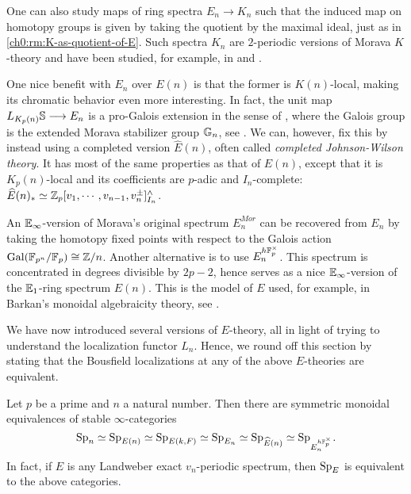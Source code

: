 \begin{remark}
    One can also study maps of ring spectra $E_n \longrightarrow K_n$ such that the induced map on homotopy groups is given by taking the quotient by the maximal ideal, just as in \cref{ch0:rm:K-as-quotient-of-E}. Such spectra $K_n$ are $2$-periodic versions of Morava $K$-theory and have been studied, for example, in \cite{hopkins-lurie_17} and \cite{barthel-pstragowski_2021}. 
\end{remark}

\begin{remark}
    One nice benefit with $E_n$ over $E(n)$ is that the former is $K(n)$-local, making its chromatic behavior even more interesting. In fact, the unit map $L_{K_p(n)}\S \longrightarrow E_n$ is a pro-Galois extension in the sense of \cite{rognes_08}, where the Galois group is the extended Morava stabilizer group $\G_n$, see \cite{devinatz-hopkins_2004}. We can, however, fix this by instead using a completed version $\widehat{E}(n)$, often called \emph{completed Johnson-Wilson theory}. It has most of the same properties as that of $E(n)$, except that it is $K_p(n)$-local and its coefficients are $p$-adic and $I_n$-complete: $\widehat{E}(n)_* \simeq \Z_p[v_1, \cdots, v_{n-1}, v_n^{\pm}]^\wedge_{I_n}$. 
\end{remark}

\begin{remark}
    An $\E_\infty$-version of Morava's original spectrum $E_n^{Mor}$ can be recovered from $E_n$ by taking the homotopy fixed points with respect to the Galois action $\mathrm{Gal}(\F_{p^n}/\F_p)\cong \Z/n$. Another alternative is to use $E_n^{h\F_p^\times}$. This spectrum is concentrated in degrees divisible by $2p-2$, hence serves as a nice $\E_\infty$-version of the $\E_1$-ring spectrum $E(n)$. This is the model of $E$ used, for example, in Barkan's monoidal algebraicity theory, see \cite{barkan_2023}. 
\end{remark}

We have now introduced several versions of $E$-theory, all in light of trying to understand the localization functor $L_n$. Hence, we round off this section by stating that the Bousfield localizations at any of the above $E$-theories are equivalent. 

\begin{proposition}
    \label{ch0:prop:all-E-local-cats-are-equivalent}
    Let $p$ be a prime and $n$ a natural number. Then there are symmetric monoidal equivalences of stable $\infty$-categories 
    \[\sp_n \simeq \sp_{E(n)} \simeq \sp_{E(k,F)}\simeq \sp_{E_n} \simeq \sp_{\widehat{E}(n)}\simeq \sp_{E_n^{h\F_p^\times}}.\]
    In fact, if $E$ is any Landweber exact $v_n$-periodic spectrum, then $\sp_E$ is equivalent to the above categories. 
\end{proposition}

